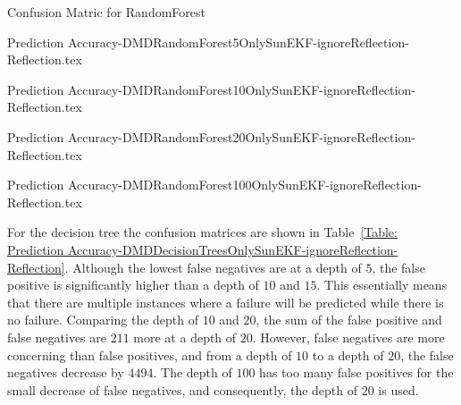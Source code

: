 \documentclass[letterpaper, 10 pt, conference]{ieeeconf}  %
\begin{document}
\begin{table*}
	\caption{Confusion Matric for RandomForest} 
	\label{Table: Prediction Accuracy-DMDRandomForestOnlySunEKF-ignoreReflection-Reflection} 
	\centering
	\begin{minipage}[c]{0.2\textwidth}
		{Prediction Accuracy-DMDRandomForest5OnlySunEKF-ignoreReflection-Reflection.tex}
	\end{minipage}
	\begin{minipage}[c]{0.2\textwidth}
		{Prediction Accuracy-DMDRandomForest10OnlySunEKF-ignoreReflection-Reflection.tex}
	\end{minipage}
	\begin{minipage}[c]{0.2\textwidth}
		{Prediction Accuracy-DMDRandomForest20OnlySunEKF-ignoreReflection-Reflection.tex}
	\end{minipage}
	\begin{minipage}[c]{0.2\textwidth}
		{Prediction Accuracy-DMDRandomForest100OnlySunEKF-ignoreReflection-Reflection.tex}
	\end{minipage}
\end{table*}

For the decision tree the confusion matrices are shown in Table~\ref{Table: Prediction Accuracy-DMDDecisionTreesOnlySunEKF-ignoreReflection-Reflection}. Although the lowest false negatives are at a depth of $5$, the false positive is significantly higher than a depth of $10$ and $15$. This essentially means that there are multiple instances where a failure will be predicted while there is no failure. Comparing the depth of $10$ and $20$, the sum of the false positive and false negatives are $211$ more at a depth of $20$. However, false negatives are more concerning than false positives, and from a depth of $10$ to a depth of $20$, the false negatives decrease by $4494$. The depth of $100$ has too many false positives for the small decrease of false negatives, and consequently, the depth of $20$ is used.
\end{document}
